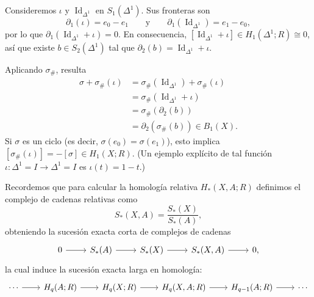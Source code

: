 \begin{dem}
Consideremos $\iota$ y $\operatorname{Id}_{\Delta^1}$ en $S_1(\Delta^1)$. Sus fronteras son
\[
\partial_1(\iota) = e_0 - e_1
\qquad \text{y} \qquad
\partial_1(\operatorname{Id}_{\Delta^1}) = e_1 - e_0,
\]
por lo que $\partial_1(\operatorname{Id}_{\Delta^1} + \iota) = 0$. En consecuencia, $[\operatorname{Id}_{\Delta^1} + \iota] \in H_1(\Delta^1; R) \cong 0$, así que existe $b \in S_2(\Delta^1)$ tal que $\partial_2(b) = \operatorname{Id}_{\Delta^1} + \iota$.

Aplicando $\sigma_\#$, resulta
\begin{align*}
\sigma + \sigma_\#(\iota) &= \sigma_\#(\operatorname{Id}_{\Delta^1}) + \sigma_\#(\iota) \\
&= \sigma_\#(\operatorname{Id}_{\Delta^1} + \iota) \\
&= \sigma_\#(\partial_2(b)) \\
&= \partial_2(\sigma_\#(b)) \in B_1(X).
\end{align*}
Si $\sigma$ es un ciclo (es decir, $\sigma(e_0) = \sigma(e_1)$), esto implica $[\sigma_\#(\iota)] = -[\sigma] \in H_1(X; R)$. (Un ejemplo explícito de tal función $\iota \colon \Delta^1 = I \to \Delta^1 = I$ es $\iota(t) = 1 - t$.)
\end{dem}

\medskip
Recordemos que para calcular la homología relativa $H_*(X, A; R)$ definimos el complejo de cadenas relativas como
\[
S_*(X, A) = \frac{S_*(X)}{S_*(A)},
\]
obteniendo la sucesión exacta corta de complejos de cadenas
\[
\begin{tikzcd}[column sep=2.4em]
0 \arrow[r] & S_*(A) \arrow[r] & S_*(X) \arrow[r] & S_*(X, A) \arrow[r] & 0,
\end{tikzcd}
\]
la cual induce la sucesión exacta larga en homología:
\[
\begin{tikzcd}[column sep=2.2em]
\cdots \arrow[r] & H_q(A; R) \arrow[r] & H_q(X; R) \arrow[r] & H_q(X, A; R) \arrow[r] & H_{q-1}(A; R) \arrow[r] & \cdots
\end{tikzcd}
\]




